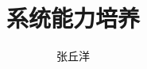 \documentclass{hustrep}
\author{张丘洋}
\title{系统能力培养}
\begin{document}
\maketitle
\tableofcontents

\newcommand{\arch}{\emph{x86}}
\newcommand{\archpath}{nemu/src/isa/\arch}
\newcommand{\pc}{\emph{pc}}
\newcommand{\eax}{\emph{eax}}









\appendix

\end{document}
